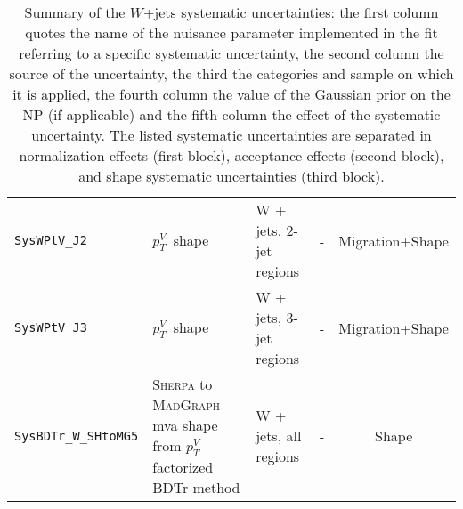 \begin{table}
{\begin{tabular}{l|llcc}
\hline
\texttt{SysWPtV\_J2}             & $p_T^V$\ shape & W + jets, $2$-jet regions & - & Migration+Shape \\
\texttt{SysWPtV\_J3}             & $p_T^V$\ shape & W + jets, $3$-jet regions & - & Migration+Shape \\
\texttt{SysBDTr\_W\_SHtoMG5}             & \textsc{Sherpa} to \textsc{MadGraph} mva shape from $p_T^V$-factorized BDTr method  & W + jets, all regions& - & Shape \\
\hline\hline
\end{tabular}
}
\caption[Summary of $W+$jet specific nuisance parameters.]{Summary of the $W$+jets systematic uncertainties: the first column quotes the name of the nuisance parameter implemented in the fit referring to a specific systematic uncertainty, the second column the source of the uncertainty, the third the categories and sample on which it is applied, the fourth column the value of  the Gaussian prior on the NP (if applicable) and the fifth column the effect of the systematic uncertainty. The listed systematic uncertainties are separated in normalization effects (first block), acceptance effects (second block), and shape systematic uncertainties (third block).}
{\label{tab:Wjets_systematics}}
\end{table}